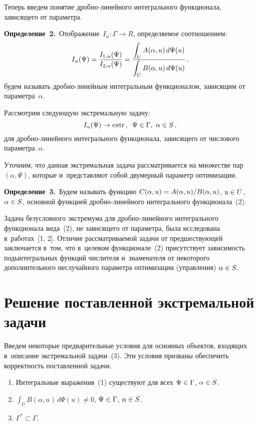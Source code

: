 \begin{multicols}{2}
     Теперь введем понятие дроб\-но-ли\-ней\-но\-го интегрального 
функционала, зависящего от па\-ра\-метра.

\smallskip

\noindent
\textbf{Определение~2.}\ Отображение~$I_\alpha: \Gamma\to R$, 
опре\-де\-ля\-емое соотношением:
\begin{equation}
I_\alpha(\Psi) = \displaystyle\frac{\displaystyle I_{1,\alpha}(\Psi)\mathstrut}{\displaystyle  
I_{2,\alpha}(\Psi)\mathstrut}=\displaystyle\frac{\displaystyle \int\nolimits_U A(\alpha,u)\,d\Psi(u)\mathstrut}{\displaystyle \int\nolimits_U B(\alpha,u)\,d\Psi(u)\mathstrut}\,,
\label{e2-shn}
\end{equation}
будем называть дроб\-но-ли\-ней\-ным интегральным функционалом, 
зависящим от па\-ра\-мет\-ра~$\alpha$.
     
     Рассмотрим следующую экстремальную задачу:
     \begin{equation}
     I_\alpha(\Psi)\to \mathrm{extr}\,,\enskip \Psi\in \Gamma,\ \alpha\in S\,,
     \label{e3-shn}
     \end{equation}
для дробно-ли\-ней\-но\-го интегрального функционала, зависящего от чис\-ло\-во\-го 
па\-ра\-мет\-ра~$\alpha$.
     
     Уточним, что данная экстремальная задача рассматривается на множестве 
пар $(\alpha, \Psi)$, которые и~пред\-став\-ля\-ют собой двумерный параметр 
оптимизации.
     
     \smallskip
     
     \noindent
     \textbf{Определение~3.}\ Будем называть функцию $C(\alpha,u)\hm= 
A(\alpha,u)/B(\alpha,u)$, $u\hm\in U$, $\alpha\hm\in S$, основной функцией  
дроб\-но-ли\-ней\-но\-го интегрального функционала~(2).
     
     Задача безусловного экстремума для дроб\-но-ли\-ней\-но\-го 
интегрального функционала вида~(2), не зависящего от па\-ра\-мет\-ра, была 
исследована в~работах~[1, 2]. Отличие рассматриваемой задачи от 
предшествующей заключается в~том, что в~целевом функционале~(2) 
присутствует зависимость подынтегральных функций чис\-ли\-те\-ля и~знаменателя 
от некоторого дополнительного неслучайного параметра оптимизации 
(управ\-ле\-ния) $\alpha\hm\in S$. 

\section{Решение поставленной экстремальной задачи}

     Введем некоторые предварительные условия для основных объектов, 
входящих в~описание экстремальной задачи~(3). Эти условия призваны 
обеспечить корректность по\-став\-лен\-ной задачи.
     \begin{enumerate}[1.]
\item Интегральные выражения~(1) 
существуют для всех $\Psi\hm\in \Gamma$, $\alpha\hm\in S$.
\item $\int\nolimits_U B(\alpha,u)\,d\Psi(u)\not= 0$, $\Psi\hm\in 
\Gamma$, $\alpha\hm\in S$. 
\item $\Gamma^*\subset \Gamma$.
\end{enumerate}


\end{multicols}
